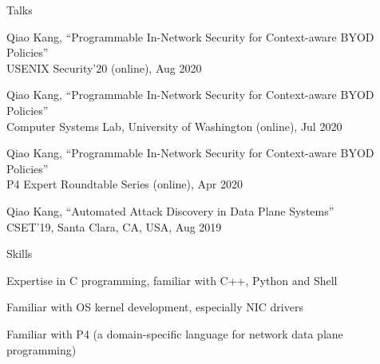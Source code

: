 \documentclass{resume} %
\begin{document}
\begin{rSection}{Talks}

\item Qiao Kang, ``Programmable In-Network Security for Context-aware BYOD Policies'' \\
USENIX Security'20 (online), Aug 2020

\item Qiao Kang, ``Programmable In-Network Security for Context-aware BYOD Policies'' \\
Computer Systems Lab, University of Washington (online), Jul 2020

\item Qiao Kang, ``Programmable In-Network Security for Context-aware BYOD Policies'' \\
P4 Expert Roundtable Series (online), Apr 2020

\item Qiao Kang, ``Automated Attack Discovery in Data Plane Systems'' \\
CSET'19, Santa Clara, CA, USA, Aug 2019

\end{rSection}




\begin{rSection}{Skills} \itemsep -3pt

\item Expertise in C programming, familiar with C++, Python and Shell
\item Familiar with OS kernel development, especially NIC drivers
\item Familiar with P4 (a domain-specific language for network data plane programming)

\end{rSection}


\end{document}

